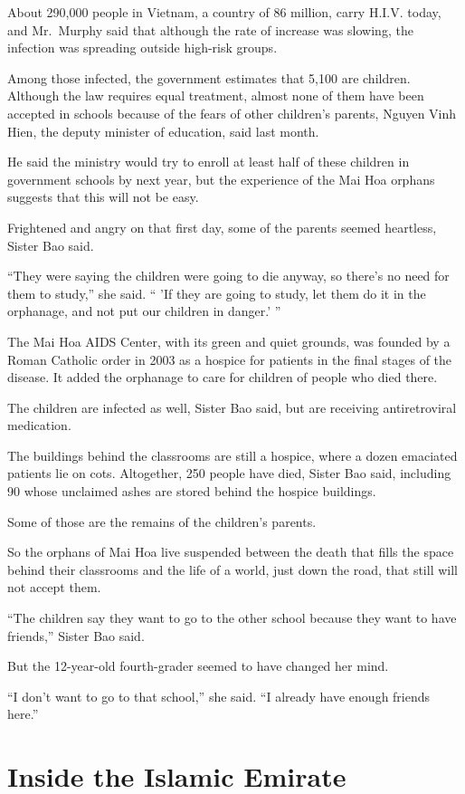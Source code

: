 ﻿\documentclass[12pt]{article}
\begin{document}
About 290,000 people in Vietnam, a country of 86 million, carry H.I.V. today, and Mr.~Murphy said
that although the rate of increase was slowing, the infection was spreading outside high-risk
groups.

Among those infected, the government estimates that 5,100 are children. Although the law requires
equal treatment, almost none of them have been accepted in schools because of the fears of other
children's parents, Nguyen Vinh Hien, the deputy minister of education, said last month.

He said the ministry would try to enroll at least half of these children in government schools by
next year, but the experience of the Mai Hoa orphans suggests that this will not be easy.

Frightened and angry on that first day, some of the parents seemed heartless, Sister Bao said.

``They were saying the children were going to die anyway, so there's no need for them to study,''
she said. `` 'If they are going to study, let them do it in the orphanage, and not put our children
in danger.' ''

The Mai Hoa AIDS Center, with its green and quiet grounds, was founded by a Roman Catholic order in
2003 as a hospice for patients in the final stages of the disease. It added the orphanage to care
for children of people who died there.

The children are infected as well, Sister Bao said, but are receiving antiretroviral medication.

The buildings behind the classrooms are still a hospice, where a dozen emaciated patients lie on
cots. Altogether, 250 people have died, Sister Bao said, including 90 whose unclaimed ashes are
stored behind the hospice buildings.

Some of those are the remains of the children's parents.

So the orphans of Mai Hoa live suspended between the death that fills the space behind their
classrooms and the life of a world, just down the road, that still will not accept them.

``The children say they want to go to the other school because they want to have friends,'' Sister
Bao said.

But the 12-year-old fourth-grader seemed to have changed her mind.

``I don't want to go to that school,'' she said. ``I already have enough friends here.''

\section{Inside the Islamic Emirate}
\end{document}
